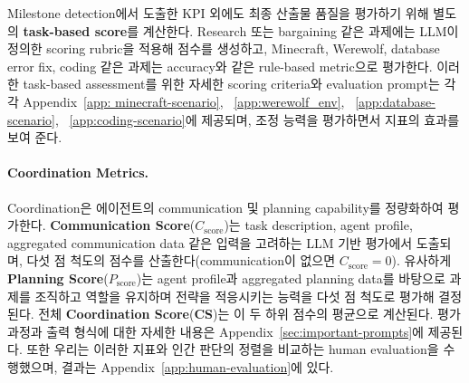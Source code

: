 Milestone detection에서 도출한 KPI 외에도 최종 산출물 품질을 평가하기 위해 별도의 \textbf{task-based score}를 계산한다. Research 또는 bargaining 같은 과제에는 LLM이 정의한 scoring rubric을 적용해 점수를 생성하고, Minecraft, Werewolf, database error fix, coding 같은 과제는 accuracy와 같은 rule-based metric으로 평가한다. 이러한 task-based assessment를 위한 자세한 scoring criteria와 evaluation prompt는 각각 Appendix~\ref{app: minecraft-scenario}, ~\ref{app:werewolf_env}, ~\ref{app:database-scenario}, ~\ref{app:coding-scenario}에 제공되며, 조정 능력을 평가하면서 지표의 효과를 보여 준다.

\paragraph{Coordination Metrics.}
Coordination은 에이전트의 communication 및 planning capability를 정량화하여 평가한다. \textbf{Communication Score}(\(C_{\text{score}}\))는 task description, agent profile, aggregated communication data 같은 입력을 고려하는 LLM 기반 평가에서 도출되며, 다섯 점 척도의 점수를 산출한다(communication이 없으면 \(C_{\text{score}} = 0\)). 유사하게 \textbf{Planning Score}(\(P_{\text{score}}\))는 agent profile과 aggregated planning data를 바탕으로 과제를 조직하고 역할을 유지하며 전략을 적응시키는 능력을 다섯 점 척도로 평가해 결정된다. 전체 \textbf{Coordination Score}(\textbf{CS})는 이 두 하위 점수의 평균으로 계산된다. 평가 과정과 출력 형식에 대한 자세한 내용은 Appendix~\ref{sec:important-prompts}에 제공된다. 또한 우리는 이러한 지표와 인간 판단의 정렬을 비교하는 human evaluation을 수행했으며, 결과는 Appendix~\ref{app:human-evaluation}에 있다.





